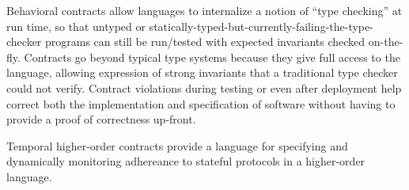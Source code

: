 Behavioral contracts allow languages to internalize a notion of ``type checking'' at run time, so that untyped or statically-typed-but-currently-failing-the-type-checker programs can still be run/tested with expected invariants checked on-the-fly.
%
Contracts go beyond typical type systems because they give full access to the language, allowing expression of strong invariants that a traditional type checker could not verify.
%
Contract violations during testing or even after deployment help correct both the implementation and specification of software without having to provide a proof of correctness up-front.

Temporal higher-order contracts provide a language for specifying and dynamically monitoring adhereance to stateful protocols in a higher-order language.
%
%
%
%
